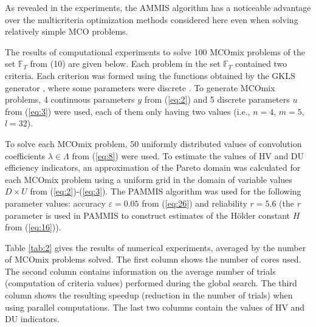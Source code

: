 \documentclass{svproc}
\begin{document}
As revealed in the experiments, the AMMIS algorithm has a noticeable advantage over the multicriteria optimization methods considered here even when solving relatively simple MCO problems.

The results of computational experiments to solve 100 MCOmix problems of the set $\mathbb{F}_T$ from (10) are given below. Each problem in the set $\mathbb{F}_T$ contained two criteria. Each criterion was formed using the functions obtained by the GKLS generator \cite{c44}, where some parameters were discrete \cite{c45}. To generate MCOmix problems, 4 continuous parameters $y$ from (\ref{eq:2}) and 5 discrete parameters $u$ from (\ref{eq:3}) were used, each of them only having two values (i.e., $n=4$, $m=5$, $l=32$).
 
To solve each MCOmix problem, 50 uniformly distributed values of convolution coefficients $\lambda \in \Lambda$ from (\ref{eq:8}) were used. To estimate the values of HV and DU efficiency indicators, an approximation of the Pareto domain was calculated for each MCOmix problem  using a uniform grid in the domain of variable values $D\times U$ from (\ref{eq:2})-(\ref{eq:3}). The PAMMIS algorithm was used for the following parameter values: accuracy $\varepsilon=0.05$ from (\ref{eq:26}) and reliability $r=5.6$ (the $r$ parameter is used in PAMMIS to construct estimates of the H{\"o}lder constant $H$ from (\ref{eq:16})). 

Table \ref{tab:2} gives the results of numerical experiments, averaged by the number of MCOmix problems solved. The first column shows the number of cores used. The second column contains information on the average number of trials (computation of criteria values) performed during the global search. The third column shows the resulting speedup (reduction in the number of trials) when using parallel computations. The last two columns contain the values of HV and DU indicators.
\end{document}

